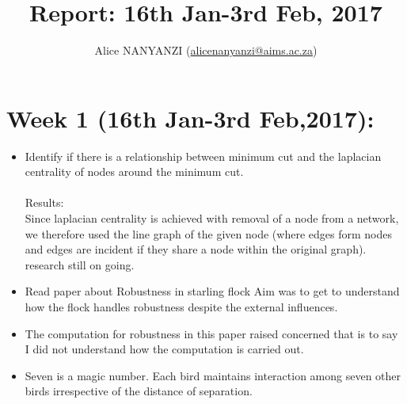 \documentclass[10pt,a4paper]{article}
\author{Alice NANYANZI (\href{mailto:alicenanyanzi@aims.ac.za}{alicenanyanzi@aims.ac.za})}
\title{Report: 16th Jan-3rd Feb, 2017}
\begin{document}
\maketitle
\section*{Week 1 (16th Jan-3rd Feb,2017):}

\begin{itemize}
\item Identify if there is a relationship between minimum cut and the laplacian centrality of nodes around the minimum cut.\\\\
Results:\\
Since laplacian centrality is achieved with removal of a node from a network, we therefore used the line graph of the given node (where edges form nodes and edges are incident if they share a node within the original graph). research still on going.
\item Read paper about Robustness in starling flock
Aim was to get to understand how the flock handles robustness despite the external influences. 
\end{itemize}
\begin{itemize}
\item The computation for robustness in this paper raised concerned that is to say I did not understand how the computation is carried out.
\item Seven is a magic number. Each bird maintains interaction among seven other birds irrespective of the distance of separation.
\end{itemize}
\end{document}
